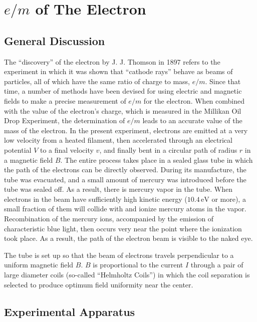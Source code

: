 \chapter{$e/ m$ of The Electron}
\section{General Discussion}
The ``discovery'' of the electron by J. J. Thomson in 1897 refers to the experiment in which it was shown that ``cathode rays'' behave as beams of particles, all of which have the same ratio of charge to mass, $e/m$. Since that time, a number of methods have been devised for using electric and magnetic fields to make a precise measurement of $e/m$ for the electron. When combined with the value of the electron's charge, which is measured in the Millikan Oil Drop Experiment, the determination of $e/m$ leads to an accurate value of the mass of the electron. In the present experiment, electrons are emitted at a very low velocity from a heated filament, then accelerated through an electrical potential $V$ to a final velocity $v$, and finally bent in a circular path of radius $r$ in a magnetic field $B$. The entire process takes place in a sealed glass tube in which the path of the electrons can be directly observed. During its manufacture, the tube was evacuated, and a small amount of mercury was introduced before the tube was sealed off. As a result, there is mercury vapor in the tube. When electrons in the beam have sufficiently high kinetic energy ($10.4\,\mathrm{eV}$ or more), a small fraction of them will collide with and ionize mercury atoms in the vapor. Recombination of the mercury ions, accompanied by the emission of characteristic blue light, then occurs very near the point where the ionization took place. As a result, the path of the electron beam is visible to the naked eye. \myskip

The tube is set up so that the beam of electrons travels perpendicular to a uniform magnetic field $B$. $B$ is proportional to the current $I$ through a pair of large diameter coils (so-called ``Helmholtz Coils'') in which the coil separation is selected to produce optimum field uniformity near the center.

\section{Experimental Apparatus}
